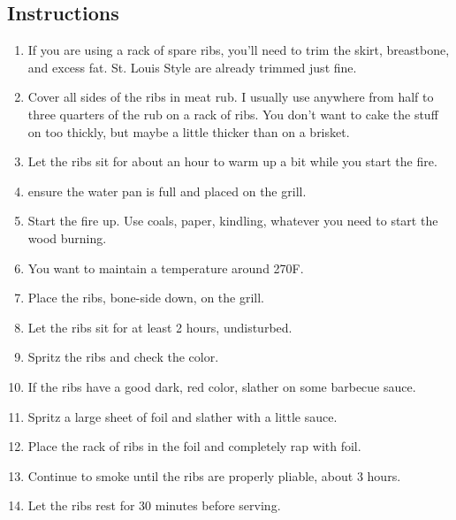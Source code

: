 \begin{multicols}{2}
\subsection*{Instructions}
\begin{enumerate}
    \item If you are using a rack of spare ribs, you'll need to trim the skirt, breastbone, and excess fat. St. Louis Style are already trimmed just fine.
    \item Cover all sides of the ribs in meat rub. I usually use anywhere from half to three quarters of the rub on a rack of ribs. You don't want to cake the stuff on too thickly, but maybe a little thicker than on a brisket.
    \item Let the ribs sit for about an hour to warm up a bit while you start the fire.
    \item ensure the water pan is full and placed on the grill.
    \item Start the fire up. Use coals, paper, kindling, whatever you need to start the wood burning.
    \item You want to maintain a temperature around 270F.
    \item Place the ribs, bone-side down, on the grill.
    \item Let the ribs sit for at least 2 hours, undisturbed.
    \item Spritz the ribs and check the color.
    \item If the ribs have a good dark, red color, slather on some barbecue sauce.
    \item Spritz a large sheet of foil and slather with a little sauce.
    \item Place the rack of ribs in the foil and completely rap with foil.
    \item Continue to smoke until the ribs are properly pliable, about 3 hours.
    \item Let the ribs rest for 30 minutes before serving.
\end{enumerate}


\end{multicols}
